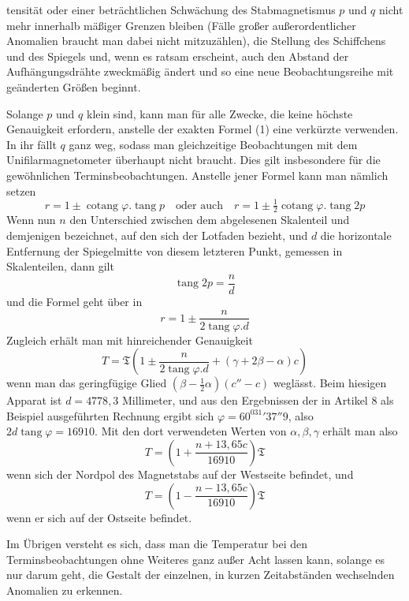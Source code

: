 tensität oder einer beträchtlichen Schwächung des Stabmagnetismus $p$ und $q$ nicht mehr innerhalb mäßiger Grenzen bleiben (Fälle großer außerordentlicher Anomalien braucht man dabei nicht mitzuzählen), die Stellung des Schiffchens und des Spiegels und, wenn es ratsam erscheint, auch den Abstand der Aufhängungsdrähte zweckmäßig ändert und so eine neue Beobachtungsreihe mit geänderten Größen beginnt.

Solange $p$ und $q$ klein sind, kann man für alle Zwecke, die keine höchste Genauigkeit erfordern, anstelle der exakten Formel (1) eine verkürzte verwenden. In ihr fällt $q$ ganz weg, sodass man gleichzeitige Beobachtungen mit dem Unifilarmagnetometer überhaupt nicht braucht. Dies gilt insbesondere für die gewöhnlichen Terminsbeobachtungen. Anstelle jener Formel kann man nämlich setzen
\[
r=1\pm\operatorname{cotang}\varphi.\operatorname{tang}p\quad\text{oder auch}\quad r=1\pm\tfrac12\operatorname{cotang}\varphi.\operatorname{tang}2p
\]
Wenn nun $n$ den Unterschied zwischen dem abgelesenen Skalenteil und demjenigen bezeichnet, auf den sich der Lotfaden bezieht, und $d$ die horizontale Entfernung der Spiegelmitte von diesem letzteren Punkt, gemessen in Skalenteilen, dann gilt
\[
\operatorname{tang}2p=\frac{n}{d}
\]
und die Formel geht über in
\[
r=1\pm\frac{n}{2\operatorname{tang}\varphi.d}
\]
Zugleich erhält man mit hinreichender Genauigkeit
\[
T=\mathfrak{T}(1\pm\frac{n}{2\operatorname{tang}\varphi.d}+(\gamma+2\beta-\alpha)c)
\]
wenn man das geringfügige Glied $(\beta-\tfrac12\alpha)(c''-c)$ weglässt. Beim hiesigen Apparat ist $d=4778{,}3$ Millimeter, und aus den Ergebnissen der in Artikel 8 als Beispiel ausgeführten Rechnung ergibt sich $\varphi=60^031'37''9$, also $2d\operatorname{tang}\varphi=16910$. Mit den dort verwendeten Werten von $\alpha,\beta,\gamma$ erhält man also
\[
T=(1+\frac{n+13{,}65c}{16910})\mathfrak{T}
\]
wenn sich der Nordpol des Magnetstabs auf der Westseite befindet, und
\[
T=(1-\frac{n-13{,}65c}{16910})\mathfrak{T}
\]
wenn er sich auf der Ostseite befindet.

Im Übrigen versteht es sich, dass man die Temperatur bei den Terminsbeobachtungen ohne Weiteres ganz außer Acht lassen kann, solange es nur darum geht, die Gestalt der einzelnen, in kurzen Zeitabständen wechselnden Anomalien zu erkennen.

